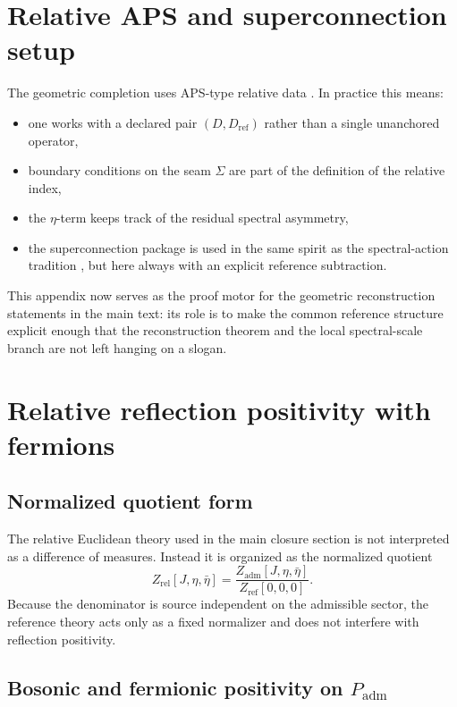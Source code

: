 \documentclass[11pt,a4paper]{article}
\theoremstyle{definition}
\theoremstyle{remark}
\newcommand{\Seam}{\Sigma}
\newcommand{\Padm}{P_{\mathrm{adm}}}
\begin{document}
\section{Relative APS and superconnection setup}
\label{app:aps}

The geometric completion uses APS-type relative data \cite{aps1975}. In practice this means:
\begin{itemize}[leftmargin=1.5em, topsep=3pt, itemsep=2pt]
    \item one works with a declared pair $(D,D_{\mathrm{ref}})$ rather than a single unanchored operator,
    \item boundary conditions on the seam $\Seam$ are part of the definition of the relative index,
    \item the $\eta$-term keeps track of the residual spectral asymmetry,
    \item the superconnection package is used in the same spirit as the spectral-action tradition \cite{chamseddineConnes1997}, but here always with an explicit reference subtraction.
\end{itemize}

This appendix now serves as the proof motor for the geometric reconstruction statements in the main text: its role is to make the common reference structure explicit enough that the reconstruction theorem and the local spectral-scale branch are not left hanging on a slogan.

\section{Relative reflection positivity with fermions}
\label{app:os-fermions}

\subsection{Normalized quotient form}

The relative Euclidean theory used in the main closure section is not interpreted as a difference of measures. Instead it is organized as the normalized quotient
\[
Z_{\mathrm{rel}}[J,\eta,\bar\eta]
=
\frac{Z_{\mathrm{adm}}[J,\eta,\bar\eta]}{Z_{\mathrm{ref}}[0,0,0]}.
\]
Because the denominator is source independent on the admissible sector, the reference theory acts only as a fixed normalizer and does not interfere with reflection positivity.

\subsection{Bosonic and fermionic positivity on \texorpdfstring{$\Padm$}{Padm}}
\end{document}
